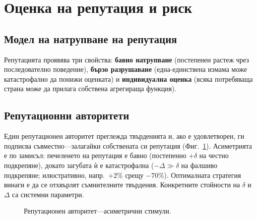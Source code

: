 \documentclass[11pt,a4paper,twocolumn]{article}
\begin{document}
\section{Оценка на репутация и риск}

\subsection{Модел на натрупване на репутация}

Репутацията проявява три свойства: \textbf{бавно натрупване} (постепенен растеж чрез последователно поведение), \textbf{бързо разрушаване} (една-единствена измама може катастрофално да понижи оценката) и \textbf{индивидуална оценка} (всяка потребяваща страна може да прилага собствена агрегираща функция).

\subsection{Репутационни авторитети}

Един репутационен авторитет преглежда твърденията и, ако е удовлетворен, ги подписва съвместно---залагайки собствената си репутация (Фиг.~\ref{fig:authority}). Асиметрията е по замисъл: печеленето на репутация е бавно (постепенно $+\delta$ на честно подкрепяне), докато загубата ѝ е катастрофална ($-\Delta \gg \delta$ на фалшиво подкрепяне; илюстративно, напр.\ $+2\%$ срещу $-70\%$). Оптималната стратегия винаги е да се отхвърлят съмнителните твърдения. Конкретните стойности на $\delta$ и $\Delta$ са системни параметри.

\begin{figure}[ht]
\centering
{}
\caption{Репутационен авторитет---асиметрични стимули.}
\label{fig:authority}
\end{figure}
\end{document}
